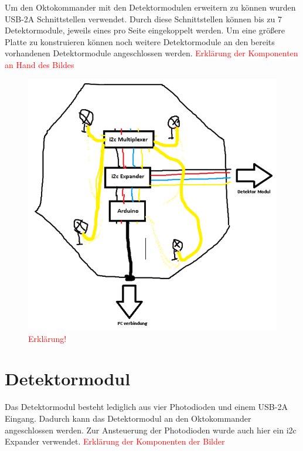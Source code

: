 Um den Oktokommander mit den Detektormodulen erweitern zu können wurden USB-2A Schnittstellen verwendet. Durch diese Schnittstellen können bis zu 7 Detektormodule, jeweils eines pro Seite  eingekoppelt werden. Um eine größere Platte zu konstruieren können noch weitere Detektormodule an den bereits vorhandenen Detektormodule angeschlossen werden.
\textcolor{red}{Erklärung der Komponenten an Hand des Bildes}

\begin{figure}[h]
	\centering
	\includegraphics[scale=0.8]{../figures/PrinzipskizzeOktokommander.png} 
	\caption{\textcolor{red}{Erklärung!}}
	\label{fig:PrinzipskizzeOktokommander}
\end{figure}


\section{Detektormodul}
\label{sec:Detektormodul}

Das Detektormodul besteht lediglich aus vier Photodioden und einem USB-2A Eingang. Dadurch kann das Detektormodul an den Oktokommander angeschlossen werden. Zur Ansteuerung der Photodioden wurde auch hier ein i2c Expander verwendet. 
\textcolor{red}{Erklärung der Komponenten der Bilder}

